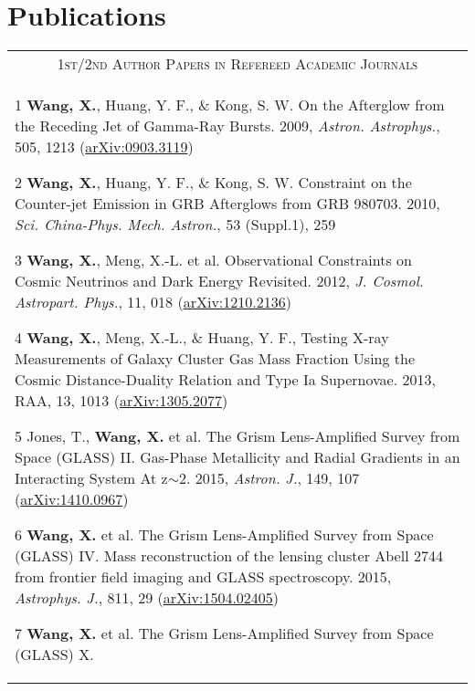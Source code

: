 \documentclass[letterpaper,10pt]{article}
\begin{document}
\section{Publications}
\begin{longtable}{p{6in}}
\multicolumn{1}{c}{\textsc{1st/2nd Author Papers in Refereed Academic Journals}}      \\
\vspace{-0.2cm}
\begin{list}{}{\leftmargin=0.5em}
    \item[1]\hypertarget{09.wang.aa}{} \textbf{Wang, X.}, Huang, Y. F., \& Kong, S. W. On the Afterglow from the Receding Jet of Gamma-Ray Bursts. 2009, \textit{Astron. Astrophys.}, 505, 1213 (\href{http://arxiv.org/abs/0903.3119}{arXiv:0903.3119})
    \item[2]\hypertarget{10.wang.scichina}{} \textbf{Wang, X.}, Huang, Y. F., \& Kong, S. W. Constraint on the Counter-jet Emission in GRB Afterglows from GRB 980703. 2010, \textit{Sci. China-Phys. Mech. Astron.}, 53 (Suppl.1), 259
    \item[3]\hypertarget{12.wang.jcap}{} \textbf{Wang, X.}, Meng, X.-L. et al. Observational Constraints on Cosmic Neutrinos and Dark Energy Revisited. 2012, \textit{J. Cosmol. Astropart. Phys.}, 11, 018 (\href{http://arxiv.org/abs/1210.2136}{arXiv:1210.2136})
    \item[4]\hypertarget{13.wang.raa}{} \textbf{Wang, X.}, Meng, X.-L., \& Huang, Y. F., Testing X-ray Measurements of Galaxy Cluster Gas
  Mass Fraction Using the Cosmic Distance-Duality Relation and Type Ia Supernovae. 2013, RAA, 13, 1013 (\href{http://arxiv.org/abs/1305.2077}{arXiv:1305.2077})
    \item[5]\hypertarget{15.jones.aj}{} Jones, T., \textbf{Wang, X.} et al. The Grism Lens-Amplified Survey from Space (GLASS) II.
        Gas-Phase Metallicity and Radial Gradients in an Interacting System At z$\sim$2. 2015, \textit{Astron. J.}, 149, 107
        (\href{http://arxiv.org/abs/1410.0967}{arXiv:1410.0967})
    \item[6]\hypertarget{15.wang.apj}{} \textbf{Wang, X.} et al. The Grism Lens-Amplified Survey from Space (GLASS) IV. 
        Mass reconstruction of the lensing cluster Abell 2744 from frontier field imaging and GLASS spectroscopy. 2015, 
        \textit{Astrophys. J.}, 811, 29 (\href{http://arxiv.org/abs/1504.02405}{arXiv:1504.02405})
    \item[7]\hypertarget{17.wang.apj}{} \textbf{Wang, X.} et al. The Grism Lens-Amplified Survey from Space (GLASS) X.

\end{list}
\end{longtable}
\end{document}
